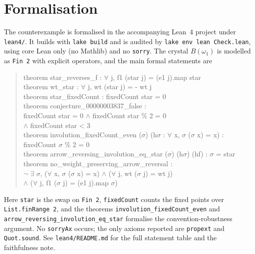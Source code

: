 \documentclass[11pt]{article}
\theoremstyle{definition}
\theoremstyle{remark}
\begin{document}
\section{Formalisation}

The counterexample is formalised in the accompanying Lean~4 project under
\texttt{lean4/}. It builds with \texttt{lake build} and is audited by
\texttt{lake env lean Check.lean}, using core Lean only (no Mathlib) and no
\texttt{sorry}. The crystal $B(\omega_1)$ is modelled as \texttt{Fin 2} with
explicit operators, and the main formal statements are

\begin{quote}\ttfamily
theorem star\_reverses\_f : \(\forall\) j, f1 (star j) = (e1 j).map star\\
theorem wt\_star : \(\forall\) j, wt (star j) = - wt j\\
theorem star\_fixedCount : fixedCount star = 0\\
theorem conjecture\_00000003837\_false :\\
\hspace*{2em}fixedCount star = 0 \(\wedge\) fixedCount star \% 2 = 0\\
\hspace*{2em}\(\wedge\) fixedCount star < 3\\
theorem involution\_fixedCount\_even (\(\sigma\)) (h\(\sigma\) : \(\forall\) x, \(\sigma\) (\(\sigma\) x) = x) :\\
\hspace*{2em}fixedCount \(\sigma\) \% 2 = 0\\
theorem arrow\_reversing\_involution\_eq\_star (\(\sigma\)) (h\(\sigma\)) (hf) : \(\sigma\) = star\\
theorem no\_weight\_preserving\_arrow\_reversal :\\
\hspace*{2em}\(\neg\) \(\exists\) \(\sigma\), (\(\forall\) x, \(\sigma\) (\(\sigma\) x) = x) \(\wedge\)
  (\(\forall\) j, wt (\(\sigma\) j) = wt j)\\
\hspace*{4em}\(\wedge\) (\(\forall\) j, f1 (\(\sigma\) j) = (e1 j).map \(\sigma\))
\end{quote}

\noindent Here \texttt{star} is the swap on \texttt{Fin 2}, \texttt{fixedCount}
counts the fixed points over \texttt{List.finRange 2}, and the theorems
\texttt{involution\_fixedCount\_even} and \texttt{arrow\_reversing\_involution\_eq\_star}
formalise the convention-robustness argument. No \texttt{sorryAx} occurs; the
only axioms reported are \texttt{propext} and \texttt{Quot.sound}. See
\texttt{lean4/README.md} for the full statement table and the faithfulness note.
\end{document}
